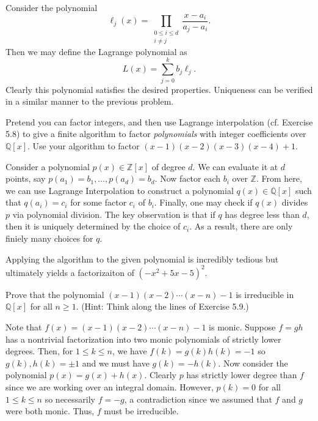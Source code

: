 \documentclass[../../master.tex]{subfiles}
\begin{document}
\begin{solution}
    Consider the polynomial
    \[
        \ell_{j}(x) = \prod_{\substack{0 \leq i \leq d \\ i \neq j}} \frac{x - a_i}{a_j - a_i}.
    \]
    Then we may define the Lagrange polynomial as
    \[
        L(x) = \sum_{j = 0}^{k} b_j \ell_{j}.
    \]
    Clearly this polynomial satisfies the desired properties.
    Uniqueness can be verified in a similar manner to the previous problem.
\end{solution}

\begin{problem}
    Pretend you can factor integers, and then use Lagrange interpolation (cf. Exercise 5.8) to give a finite algorithm to factor \textit{polynomials} with integer coefficients over $\mathbb{Q}[x]$.
    Use your algorithm to factor $(x-1)(x-2)(x-3)(x-4)+1$.
\end{problem}

\begin{solution}
    Consider a polynomial $p(x) \in \mathbb{Z}[x]$ of degree $d$.
    We can evaluate it at $d$ points, say $p(a_1) = b_1, \ldots, p(a_d) = b_d$.
    Now factor each $b_i$ over $\mathbb{Z}$.
    From here, we can use Lagrange Interpolation to construct a polynomial $q(x) \in \mathbb{Q}[x]$ such that $q(a_i) = c_i$ for some factor $c_i$ of $b_i$.
    Finally, one may check if $q(x)$ divides $p$ via polynomial division.
    The key observation is that if $q$ has degree less than $d$, then it is uniquely determined by the choice of $c_i$.
    As a result, there are only finiely many choices for $q$.

    Applying the algorithm to the given polynomial is incredibly tedious but ultimately yields a factorizaiton of $(-x^2 + 5x - 5)^2$.
\end{solution}

\begin{problem}
    Prove that the polynomial $(x-1)(x-2)\cdots(x-n) - 1$ is irreducible in $\mathbb{Q}[x]$ for all $n \geq 1$. 
    (Hint: Think along the lines of Exercise 5.9.)
\end{problem}

\begin{solution}
    Note that $f(x) = (x-1)(x-2) \cdots (x-n) - 1$ is monic.
    Suppose $f = gh$ has a nontrivial factorization into two monic polynomials of strictly lower degrees.
    Then, for $1 \leq k \leq n$, we have $f(k) = g(k) h(k) = -1$ so $g(k), h(k) = \pm 1$ and we must have $g(k) = -h(k)$.
    Now consider the polynomial $p(x) = g(x) + h(x)$. 
    Clearly  $p$ has strictly lower degree than $f$ since we are working over an integral domain.
    However, $p(k) = 0$ for all $1 \leq k \leq n$ so necessarily $f = -g$, a contradiction since we assumed that $f$ and $g$ were both monic.
    Thus, $f$ must be irreducible.
\end{solution}
\end{document}
